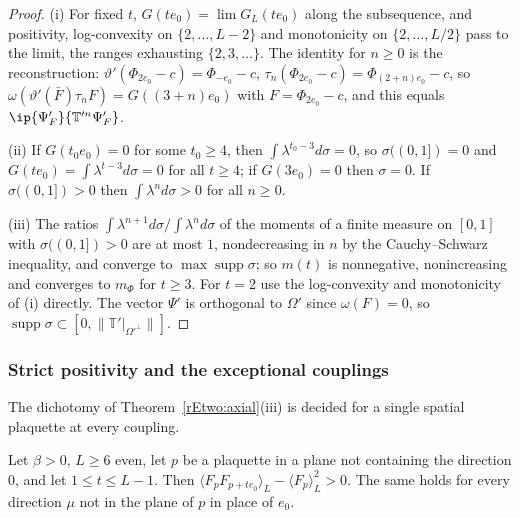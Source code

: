 \begin{proof}
(i) For fixed $t$, $G(te_0)=\lim G_L(te_0)$ along the subsequence, and
positivity, log-convexity on $\{2,\dots,L-2\}$ and monotonicity on
$\{2,\dots,L/2\}$ pass to the limit, the ranges exhausting $\{2,3,\dots\}$.
The identity for $n\ge0$ is the reconstruction: $\vartheta'(\Phi_{2e_0}-c)
=\Phi_{-e_0}-c$, $\tau_n(\Phi_{2e_0}-c)=\Phi_{(2+n)e_0}-c$, so $\omega(
\vartheta'(\bar F)\tau_nF)=G((3+n)e_0)$ with $F=\Phi_{2e_0}-c$, and this
equals $\ip{\Psi'_F}{\mathbb T'^n\Psi'_F}$.

(ii) If $G(t_0e_0)=0$ for some $t_0\ge4$, then $\int\lambda^{t_0-3}d\sigma
=0$, so $\sigma((0,1])=0$ and $G(te_0)=\int\lambda^{t-3}d\sigma=0$ for all
$t\ge4$; if $G(3e_0)=0$ then $\sigma=0$. If $\sigma((0,1])>0$ then
$\int\lambda^nd\sigma>0$ for all $n\ge0$.

(iii) The ratios $\int\lambda^{n+1}d\sigma/\int\lambda^nd\sigma$ of the
moments of a finite measure on $[0,1]$ with $\sigma((0,1])>0$ are at most
$1$, nondecreasing in $n$ by the Cauchy--Schwarz inequality, and converge
to $\max\operatorname{supp}\sigma$; so $m(t)$ is nonnegative, nonincreasing
and converges to $m_\Phi$ for $t\ge3$. For $t=2$ use the log-convexity and
monotonicity of (i) directly. The vector $\Psi'$ is orthogonal to
$\Omega'$ since $\omega(F)=0$, so $\operatorname{supp}\sigma\subset[0,\|
\mathbb T'|_{\Omega'^\perp}\|]$.
\end{proof}

\subsubsection{Strict positivity and the exceptional couplings}

The dichotomy of Theorem~\ref{rEtwo:axial}(iii) is decided for a single
spatial plaquette at every coupling.

\begin{theorem}\label{rEtwo:plaquette}
Let $\beta>0$, $L\ge6$ even, let $p$ be a plaquette in a plane not
containing the direction $0$, and let $1\le t\le L-1$. Then
$\langle F_pF_{p+te_0}\rangle_L-\langle F_p\rangle_L^2>0$. The same holds
for every direction $\mu$ not in the plane of $p$ in place of $e_0$.
\end{theorem}

